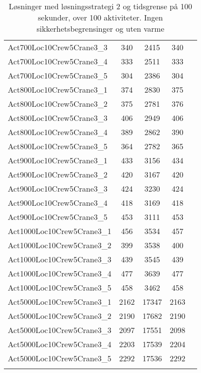 {\begin{center}
\begin{longtable}{ | l | c | c | c | c | }
Act700Loc10Crew5Crane3\_3	&	340	&	2415	&	340	\\
Act700Loc10Crew5Crane3\_4	&	333	&	2511	&	333	\\
Act700Loc10Crew5Crane3\_5	&	304	&	2386	&	304	\\
Act800Loc10Crew5Crane3\_1	&	374	&	2830	&	375	\\
Act800Loc10Crew5Crane3\_2	&	375	&	2781	&	376	\\
Act800Loc10Crew5Crane3\_3	&	406	&	2949	&	406	\\
Act800Loc10Crew5Crane3\_4	&	389	&	2862	&	390	\\
Act800Loc10Crew5Crane3\_5	&	364	&	2782	&	365	\\
Act900Loc10Crew5Crane3\_1	&	433	&	3156	&	434	\\
Act900Loc10Crew5Crane3\_2	&	420	&	3167	&	420	\\
Act900Loc10Crew5Crane3\_3	&	424	&	3230	&	424	\\
Act900Loc10Crew5Crane3\_4	&	418	&	3169	&	418	\\
Act900Loc10Crew5Crane3\_5	&	453	&	3111	&	453	\\
Act1000Loc10Crew5Crane3\_1	&	456	&	3534	&	457	\\
Act1000Loc10Crew5Crane3\_2	&	399	&	3538	&	400	\\
Act1000Loc10Crew5Crane3\_3	&	439	&	3545	&	439	\\
Act1000Loc10Crew5Crane3\_4	&	477	&	3639	&	477	\\
Act1000Loc10Crew5Crane3\_5	&	458	&	3462	&	458	\\
Act5000Loc10Crew5Crane3\_1	&	2162	&	17347	&	2163	\\
Act5000Loc10Crew5Crane3\_2	&	2190	&	17682	&	2190	\\
Act5000Loc10Crew5Crane3\_3	&	2097	&	17551	&	2098	\\
Act5000Loc10Crew5Crane3\_4	&	2203	&	17539	&	2204	\\
Act5000Loc10Crew5Crane3\_5	&	2292	&	17536	&	2292	\\
\hline							
\caption{Løsninger med løsningsstrategi 2 og tidsgrense på 100 sekunder, over 100 aktiviteter. Ingen sikkerhetsbegrensinger og uten varme}			
\label{tab:solutionUtenSikkerhetOgVarmeLS2Over100_100s}							
\end{longtable}				
\end{center}
}%